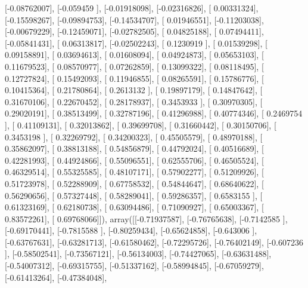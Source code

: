 \documentclass{article}
\begin{document}
       [-0.08762007],
       [-0.059459  ],
       [-0.01918098],
       [-0.02316826],
       [ 0.00331324],
       [-0.15598267],
       [-0.09894753],
       [-0.14534707],
       [ 0.01946551],
       [-0.11203038],
       [-0.00679229],
       [-0.12459071],
       [-0.02782505],
       [ 0.04825188],
       [ 0.07494411],
       [-0.05841431],
       [ 0.06313817],
       [-0.02502243],
       [ 0.1230919 ],
       [ 0.01539298],
       [ 0.09158891],
       [ 0.03694613],
       [ 0.01608094],
       [ 0.04924873],
       [ 0.05653103],
       [ 0.11679523],
       [ 0.08570977],
       [ 0.07262859],
       [ 0.13099322],
       [ 0.08118495],
       [ 0.12727824],
       [ 0.15492093],
       [ 0.11946855],
       [ 0.08265591],
       [ 0.15786776],
       [ 0.10415364],
       [ 0.21780864],
       [ 0.2613132 ],
       [ 0.19897179],
       [ 0.14847642],
       [ 0.31670106],
       [ 0.22670452],
       [ 0.28178937],
       [ 0.3453933 ],
       [ 0.30970305],
       [ 0.29020191],
       [ 0.38513499],
       [ 0.32787196],
       [ 0.41296988],
       [ 0.40774346],
       [ 0.2469754 ],
       [ 0.41109131],
       [ 0.32013862],
       [ 0.39699708],
       [ 0.31660442],
       [ 0.30150706],
       [ 0.3453198 ],
       [ 0.32269792],
       [ 0.34200323],
       [ 0.45505579],
       [ 0.48970188],
       [ 0.35862097],
       [ 0.38813188],
       [ 0.54856879],
       [ 0.44792024],
       [ 0.40516689],
       [ 0.42281993],
       [ 0.44924866],
       [ 0.55096551],
       [ 0.62555706],
       [ 0.46505524],
       [ 0.46329514],
       [ 0.55325585],
       [ 0.48107171],
       [ 0.57902277],
       [ 0.51209926],
       [ 0.51723978],
       [ 0.52288909],
       [ 0.67758532],
       [ 0.54844647],
       [ 0.68640622],
       [ 0.56290656],
       [ 0.57327448],
       [ 0.58289041],
       [ 0.59286357],
       [ 0.6583155 ],
       [ 0.61323169],
       [ 0.62180738],
       [ 0.63094486],
       [ 0.71090927],
       [ 0.65003367],
       [ 0.83572261],
       [ 0.69768066]]), array([[-0.71937587],
       [-0.76765638],
       [-0.7142585 ],
       [-0.69170441],
       [-0.7815588 ],
       [-0.80259434],
       [-0.65624858],
       [-0.643006  ],
       [-0.63767631],
       [-0.63281713],
       [-0.61580462],
       [-0.72295726],
       [-0.76402149],
       [-0.607236  ],
       [-0.58502541],
       [-0.73567121],
       [-0.56134003],
       [-0.74427065],
       [-0.63631488],
       [-0.54007312],
       [-0.69315755],
       [-0.51337162],
       [-0.58994845],
       [-0.67059279],
       [-0.61413264],
       [-0.47384048],
\end{document}
